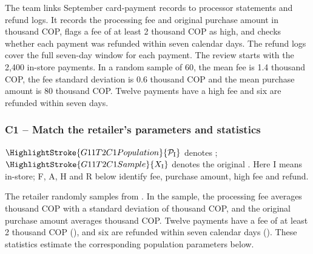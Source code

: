 	The team links September card-payment records to processor statements and refund logs. It records the processing fee and original purchase amount in thousand COP, flags a fee of at least 2 thousand COP as high, and checks whether each payment was refunded within seven calendar days. The refund logs cover the full seven-day window for each payment. The review starts with the 2,400 in-store payments. In a random sample of 60, the mean fee is 1.4 thousand COP, the fee standard deviation is 0.6 thousand COP and the mean purchase amount is 80 thousand COP. Twelve payments have a high fee and six are refunded within seven days.


	
	\subsubsection*{C1 -- Match the retailer's parameters and statistics}
	\label{sol:c1-merchant-fees-a}

    $\HighlightStroke{G11T2C1Population}{\mathcal{P}_{\mathrm{I}}}$ denotes ; $\HighlightStroke{G11T2C1Sample}{X_{\mathrm{I}}}$ denotes the original . Here I means in-store; F, A, H and R below identify fee, purchase amount, high fee and refund.

	The retailer randomly samples  from  . In the sample, the processing fee averages  thousand COP with a standard deviation of  thousand COP, and the original purchase amount averages  thousand COP. Twelve payments have a fee of at least 2 thousand COP (), and six are refunded within seven calendar days (). These statistics estimate the corresponding population parameters below.

